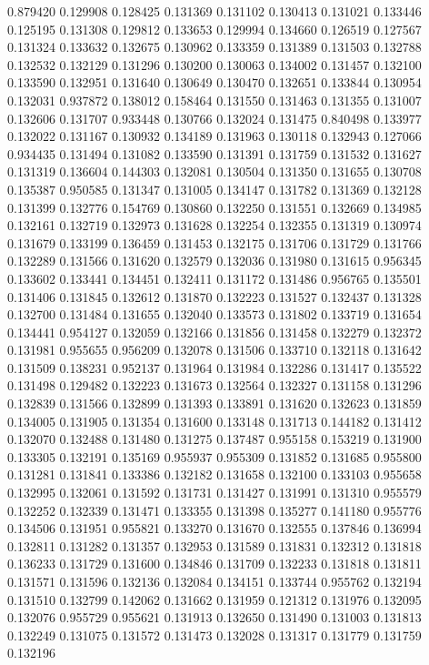 0.879420
0.129908
0.128425
0.131369
0.131102
0.130413
0.131021
0.133446
0.125195
0.131308
0.129812
0.133653
0.129994
0.134660
0.126519
0.127567
0.131324
0.133632
0.132675
0.130962
0.133359
0.131389
0.131503
0.132788
0.132532
0.132129
0.131296
0.130200
0.130063
0.134002
0.131457
0.132100
0.133590
0.132951
0.131640
0.130649
0.130470
0.132651
0.133844
0.130954
0.132031
0.937872
0.138012
0.158464
0.131550
0.131463
0.131355
0.131007
0.132606
0.131707
0.933448
0.130766
0.132024
0.131475
0.840498
0.133977
0.132022
0.131167
0.130932
0.134189
0.131963
0.130118
0.132943
0.127066
0.934435
0.131494
0.131082
0.133590
0.131391
0.131759
0.131532
0.131627
0.131319
0.136604
0.144303
0.132081
0.130504
0.131350
0.131655
0.130708
0.135387
0.950585
0.131347
0.131005
0.134147
0.131782
0.131369
0.132128
0.131399
0.132776
0.154769
0.130860
0.132250
0.131551
0.132669
0.134985
0.132161
0.132719
0.132973
0.131628
0.132254
0.132355
0.131319
0.130974
0.131679
0.133199
0.136459
0.131453
0.132175
0.131706
0.131729
0.131766
0.132289
0.131566
0.131620
0.132579
0.132036
0.131980
0.131615
0.956345
0.133602
0.133441
0.134451
0.132411
0.131172
0.131486
0.956765
0.135501
0.131406
0.131845
0.132612
0.131870
0.132223
0.131527
0.132437
0.131328
0.132700
0.131484
0.131655
0.132040
0.133573
0.131802
0.133719
0.131654
0.134441
0.954127
0.132059
0.132166
0.131856
0.131458
0.132279
0.132372
0.131981
0.955655
0.956209
0.132078
0.131506
0.133710
0.132118
0.131642
0.131509
0.138231
0.952137
0.131964
0.131984
0.132286
0.131417
0.135522
0.131498
0.129482
0.132223
0.131673
0.132564
0.132327
0.131158
0.131296
0.132839
0.131566
0.132899
0.131393
0.133891
0.131620
0.132623
0.131859
0.134005
0.131905
0.131354
0.131600
0.133148
0.131713
0.144182
0.131412
0.132070
0.132488
0.131480
0.131275
0.137487
0.955158
0.153219
0.131900
0.133305
0.132191
0.135169
0.955937
0.955309
0.131852
0.131685
0.955800
0.131281
0.131841
0.133386
0.132182
0.131658
0.132100
0.133103
0.955658
0.132995
0.132061
0.131592
0.131731
0.131427
0.131991
0.131310
0.955579
0.132252
0.132339
0.131471
0.133355
0.131398
0.135277
0.141180
0.955776
0.134506
0.131951
0.955821
0.133270
0.131670
0.132555
0.137846
0.136994
0.132811
0.131282
0.131357
0.132953
0.131589
0.131831
0.132312
0.131818
0.136233
0.131729
0.131600
0.134846
0.131709
0.132233
0.131818
0.131811
0.131571
0.131596
0.132136
0.132084
0.134151
0.133744
0.955762
0.132194
0.131510
0.132799
0.142062
0.131662
0.131959
0.121312
0.131976
0.132095
0.132076
0.955729
0.955621
0.131913
0.132650
0.131490
0.131003
0.131813
0.132249
0.131075
0.131572
0.131473
0.132028
0.131317
0.131779
0.131759
0.132196
